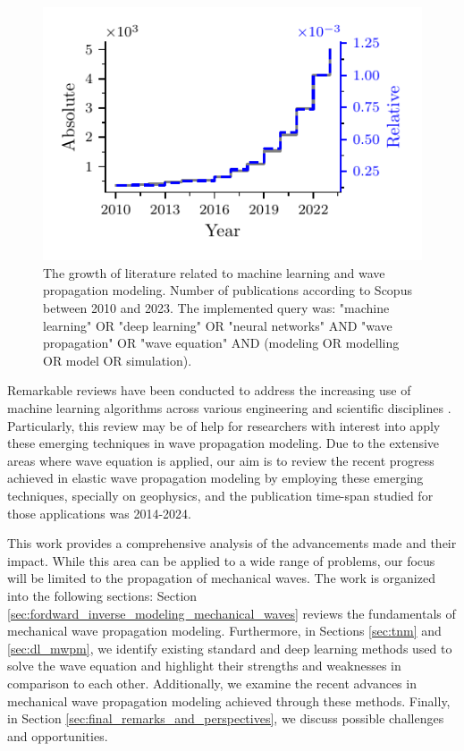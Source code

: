 \documentclass[11pt,twoside]{article}
\begin{document}
\begin{figure}[H]
\centering
    \includegraphics[scale=1]{figs/publications_with_relative.pdf}
    \caption{The growth of literature related to machine learning and wave propagation modeling. Number of publications according 
    to Scopus between 2010 and 2023. The implemented query was: "machine learning" OR "deep learning" OR "neural networks" AND 
    "wave propagation" OR "wave equation" AND (modeling OR modelling OR model OR simulation).}
    \label{dl-wave_propagation-publications}
\end{figure}

Remarkable reviews have been conducted to address the increasing use of machine learning algorithms across various engineering and scientific 
disciplines \citep{vadyala_review_2022,deng_physics-informed_2023,lino_current_2023}. Particularly, this review may be of help for 
researchers with interest into apply these emerging techniques in wave propagation modeling. Due to the extensive areas where wave equation 
is applied, our aim is to review the recent progress achieved in elastic wave propagation modeling by employing these emerging techniques, 
specially on geophysics, and the publication time-span studied for those applications was 2014-2024.

This work provides a comprehensive analysis of the advancements made and their impact. While this area can be applied to a wide range of 
problems, our focus will be limited to the propagation of mechanical waves. The work is organized into the following sections: 
Section \ref{sec:fordward_inverse_modeling_mechanical_waves} reviews the fundamentals of mechanical wave propagation modeling. 
Furthermore, in Sections \ref{sec:tnm} and \ref{sec:dl_mwpm}, we identify existing standard and deep learning methods used to solve 
the wave equation and highlight their strengths and weaknesses in comparison to each other. Additionally, we examine the recent 
advances in mechanical wave propagation modeling achieved through these methods. Finally, in Section 
\ref{sec:final_remarks_and_perspectives}, we discuss possible challenges and opportunities.
\end{document}
